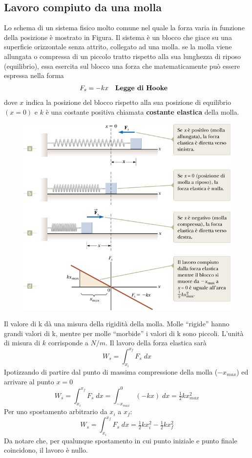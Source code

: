 \documentclass[a4paper,11pt,oneside]{book}
\begin{document}
\subsection{Lavoro compiuto da una molla}
Lo schema di un sistema fisico molto comune nel quale la forza varia in funzione della posizione è mostrato in Figura. Il sistema è un blocco che giace su una superficie orizzontale senza attrito, collegato ad una molla.
se la molla viene allungata o compressa di un piccolo tratto rispetto alla sua lunghezza di riposo (equilibrio), essa esercita sul blocco una forza che matematicamente può essere espressa nella forma
\begin{align*}
    F_s &= -kx & &\text{\textbf{Legge di Hooke}} 
\end{align*}
dove $x$ indica la posizione del blocco rispetto alla sua posizione di equilibrio $(x = 0)$ e $k$ è una costante positiva chiamata \textbf{costante elastica} della molla.

\newpage
\begin{figure}[h]
    \centering
    \includegraphics[scale=0.4]{lavoro_molla.png}
\end{figure}
Il valore di k dà una misura della rigidità della molla. Molle “rigide” hanno grandi valori di k, mentre per molle “morbide” i valori di k sono piccoli. L'unità di misura di $k$ corrisponde a $N/m$.
Il lavoro della forza elastica sarà
\begin{equation*}
    W_s = \int_{x_i}^{x_f}F_s \;dx
\end{equation*}
Ipotizzando di partire dal punto di massima compressione della molla ($-x_{max}$) ed arrivare al punto $x=0$
\begin{equation*}
    W_s = \int_{x_i}^{x_f}F_s \; dx = \int_{-x_{max}}^{0} (-kx) \; dx = \tfrac{1}{2}kx^2_{max}
\end{equation*}
Per uno spostamento arbitrario da $x_i$ a $x_f$:
\begin{equation*}
    W_s = \int_{x_i}^{x_f}F_s \; dx = \tfrac{1}{2} kx_i^2 - \tfrac{1}{2}kx_f^2
\end{equation*}
Da notare che, per qualunque spostamento in cui punto iniziale e punto finale coincidono, il lavoro è nullo.
\end{document}
